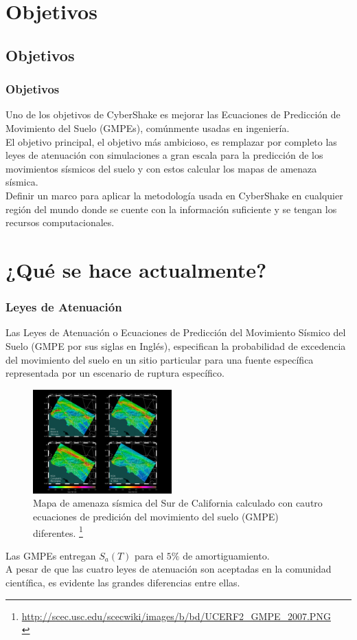 \documentclass{beamer}
\begin{document}
%
%
\section{Objetivos}
\subsection{Objetivos}
\begin{frame}%
\frametitle{Objetivos}
%
\justifying
%
Uno de los objetivos de CyberShake es mejorar las Ecuaciones de Predicción de Movimiento del Suelo (GMPEs), comúnmente usadas en ingeniería.\\
%
El objetivo principal, el objetivo más ambicioso, es remplazar por completo las leyes de atenuación con simulaciones a gran escala para la predicción de los movimientos sísmicos del suelo y con estos calcular los mapas de amenaza sísmica.\\
%
Definir un marco para aplicar la metodología usada en CyberShake en cualquier región del mundo donde se cuente con la información suficiente y se tengan los recursos computacionales.
%
%
\end{frame}
%
%
\section{¿Qué se hace actualmente?}
\begin{frame}[allowframebreaks]\frametitle{Leyes de Atenuación}
%
\justifying
Las Leyes de Atenuación o Ecuaciones de Predicción del Movimiento Sísmico del Suelo (GMPE por sus siglas en Inglés), especifican la probabilidad de excedencia del movimiento del suelo en un sitio particular para una fuente específica representada por un escenario de ruptura específico.
%
\begin{figure}[h]
	\centering
	\includegraphics[height=4cm]{img/UCERF2_GMPE_2007.pdf}
	\caption{Mapa de amenaza sísmica del Sur de California calculado con cautro ecuaciones de predición del movimiento del suelo (GMPE) diferentes. \footnote{ \tiny\url{http://scec.usc.edu/scecwiki/images/b/bd/UCERF2_GMPE_2007.PNG}\\}}
	\vspace{-.5 cm}
\end{figure}
%
\justifying
Las GMPEs entregan $S_a \left( T \right)$ para el $5\%$ de amortiguamiento.\\
%
A pesar de que las cuatro leyes de atenuación son aceptadas en la comunidad científica, es evidente las grandes diferencias entre ellas.\\
%
%
\end{frame}
%
%
\end{document}
